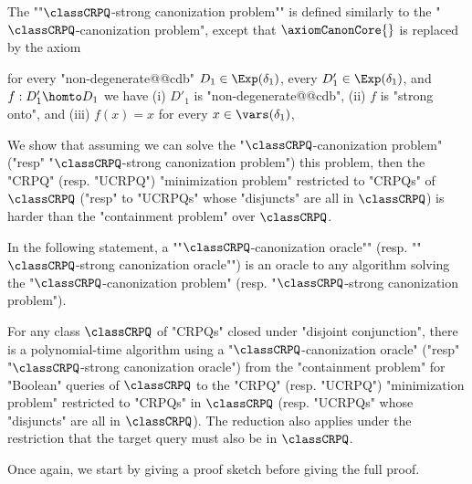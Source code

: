 The \AP""$\classCRPQ$-strong canonization problem"" is defined similarly to the "$\classCRPQ$-canonization problem", except that $\axiomCanonCore{}$ is replaced by the axiom
\begin{description}
	\itemAP[\intro*\axiomStrongCanonCore{}:] 
	for every "non-degenerate@@cdb" 
		$D_1 \in \Exp(\delta_1)$, every $D'_1 \in \Exp(\delta_1)$, and $f: D'_1 \homto D_1$ we have (i) $D'_1$ is "non-degenerate@@cdb", (ii) $f$ is "strong onto", and (iii)  $f(x)=x$ for every $x\in \vars(\delta_1)$,
\end{description}

We show that assuming we can solve the "$\classCRPQ$-canonization problem" ("resp" "$\classCRPQ$-strong canonization problem") this problem, then the "CRPQ"
(resp. "UCRPQ") "minimization problem"
restricted to "CRPQs" of $\classCRPQ$ ("resp" to "UCRPQs" whose "disjuncts" are all in $\classCRPQ$) is harder than the "containment problem" over $\classCRPQ$.

In the following statement, a \AP""$\classCRPQ$-canonization oracle"" (resp. \AP""$\classCRPQ$-strong canonization oracle"") is an oracle to any algorithm solving the "$\classCRPQ$-canonization problem" (resp. "$\classCRPQ$-strong canonization problem").

\begin{lemma}
	\AP\label{lem:reduction-containment-to-minimization}
	For any class $\classCRPQ$ of "CRPQs" closed under "disjoint conjunction",
	there is a polynomial-time algorithm
	using a "$\classCRPQ$-canonization oracle" ("resp" "$\classCRPQ$-strong canonization oracle")
	from the "containment problem" for "Boolean" queries of $\classCRPQ$ to the
	"CRPQ" (resp. "UCRPQ") "minimization problem" restricted to "CRPQs" in $\classCRPQ$
	(resp. "UCRPQs" whose "disjuncts" are all in $\classCRPQ$).
	The reduction also applies under the restriction that the target query must also be in
	$\classCRPQ$.
\end{lemma}

Once again, we start by giving a proof sketch before giving the full proof.

